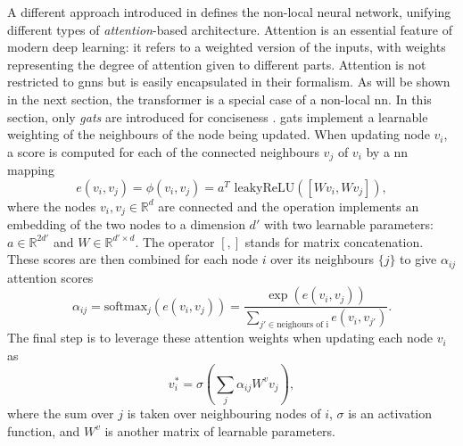 A different approach introduced in \cite{nlnnPaper} defines the non-local neural network, unifying different types of \textit{attention}-based architecture. Attention is an essential feature of modern deep learning: it refers to a weighted version of the inputs, with weights representing the degree of attention given to different parts. Attention is not restricted to \glspl{gnn} but is easily encapsulated in their formalism. As will be shown in the next section, the transformer is a special case of a non-local \gls{nn}. In this section, only \textit{\glspl{gat}} are introduced for conciseness \cite{velickovic2018graph}. \glspl{gat} implement a learnable weighting of the neighbours of the node being updated. When updating node $v_i$, a score is computed for each of the connected neighbours $v_j$ of $v_i$ by a \gls{nn} mapping \[e(v_i, v_j) = \phi(v_i, v_j) = a^T \text{ leakyReLU}([W v_i, Wv_j]),\] where the nodes $v_i, v_j \in \mathbb{R}^d$ are connected and the operation implements an embedding of the two nodes to a dimension $d'$ with two learnable parameters: $a \in \mathbb{R}^{2d'}$ and $W \in \mathbb{R}^{d' \times d}$. The operator $[,]$ stands for matrix concatenation. These scores are then combined for each node $i$ over its neighbours $\{j\}$ to give $\alpha_{ij}$ attention scores \[ \alpha_{ij} = \text{softmax}_j (e(v_i, v_j)) = \frac{\exp(e(v_i, v_j))}{\sum_{j' \in \text{neighours of i}}e(v_i, v_{j'})}.\] The final step is to leverage these attention weights when updating each node $v_i$ as \[v^*_i = \sigma\left(\sum_{j} \alpha_{ij} W^v v_j \right),\] where the sum over $j$ is taken over neighbouring nodes of $i$, $\sigma$ is an activation function, and $W^v$ is another matrix of learnable parameters.

